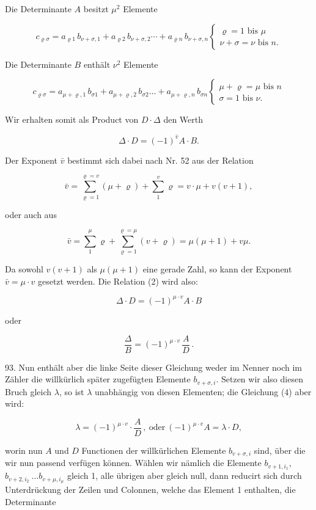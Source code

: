 \documentclass[11pt]{article}
\providecommand{\weberpage}[1]{}
\providecommand{\weq}[2]{\begin{equation}\tag{#1}#2\end{equation}}
\begin{document}
Die Determinante $A$ besitzt $\mu^2$ Elemente

\[
c_{\varrho\sigma} = a_{\varrho 1}\, b_{\nu+\sigma,1} + a_{\varrho 2}\, b_{\nu+\sigma,2} \cdots + a_{\varrho n}\, b_{\nu+\sigma,n}
\begin{cases}
\varrho = 1 \text{ bis } \mu \\
\nu + \sigma = \nu \text{ bis } n.
\end{cases}
\]

Die Determinante $B$ enthält $\nu^2$ Elemente

\[
c_{\varrho\sigma} = a_{\mu+\varrho,1}\, b_{\sigma 1} + a_{\mu+\varrho,2}\, b_{\sigma 2} \ldots + a_{\mu+\varrho,n}\, b_{\sigma n}
\begin{cases}
\mu + \varrho = \mu \text{ bis } n \\
\sigma = 1 \text{ bis } \nu.
\end{cases}
\]


\weberpage{97}
Wir erhalten somit als Product von $D \cdot \varDelta$ den Werth

\weq{2}{\varDelta \cdot D = (-1)^{\bar v} A \cdot B.}

Der Exponent $\bar v$ bestimmt sich dabei nach Nr. 52 aus der Relation

\[
\bar v = \sum_{\varrho=1}^{\varrho=v}(\mu+\varrho) + \sum_{1}^{v}\varrho = v\cdot\mu + v(v+1),
\]

oder auch aus

\[
\bar v = \sum_{1}^{\mu}\varrho + \sum_{\varrho=1}^{\varrho=\mu}(v+\varrho) = \mu(\mu+1) + v\mu.
\]

Da sowohl $v(v+1)$ als $\mu(\mu+1)$ eine gerade Zahl, so kann der Exponent $\bar v = \mu\cdot v$ gesetzt werden. Die Relation (2) wird also:

\weq{3}{\varDelta \cdot D = (-1)^{\mu\cdot v} A \cdot B}

oder

\weq{4}{\frac{\varDelta}{B} = (-1)^{\mu\cdot v}\,\frac{A}{D}\,.}

93. Nun enth\"alt aber die linke Seite dieser Gleichung weder im Nenner noch im Z\"ahler die willk\"urlich sp\"ater zugef\"ugten Elemente $b_{v+\sigma,i}$. Setzen wir also diesen Bruch gleich $\lambda$, so ist $\lambda$ unabh\"angig von diesen Elementen; die Gleichung (4) aber wird:

\weq{5}{\lambda = (-1)^{\mu\cdot v}\cdot\frac{A}{D}\,,\ \text{oder}\ (-1)^{\mu\cdot v} A = \lambda\cdot D,}

worin nun $A$ und $D$ Functionen der willk\"urlichen Elemente $b_{v+\sigma,i}$ sind, \"uber die wir nun passend verf\"ugen k\"onnen. W\"ahlen wir n\"amlich die Elemente $b_{v+1,i_1}$, $b_{v+2,i_2}\ \ldots b_{v+\mu,i_\mu}$ gleich 1, alle \"ubrigen aber gleich null, dann reducirt sich durch Unterdr\"uckung der Zeilen und Colonnen, welche das Element 1 enthalten, die Determinante
\end{document}
